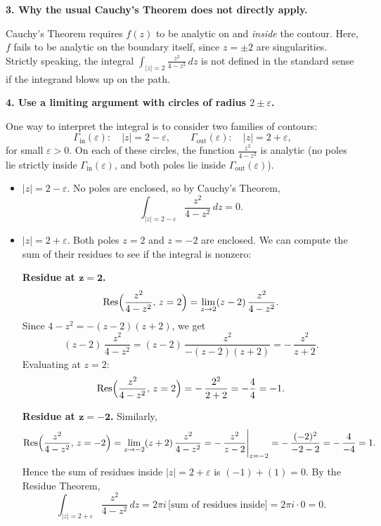 \documentclass[12pt]{article}
\theoremstyle{definition} %
\theoremstyle{plain} %
\begin{document}
\textbf{3. Why the usual Cauchy’s Theorem does not directly apply.}

Cauchy’s Theorem requires \(f(z)\) to be analytic on and \emph{inside} the contour.  Here, \(f\) fails to be analytic on the boundary itself, since \(z=\pm 2\) are singularities.  Strictly speaking, the integral
\(\displaystyle \int_{\lvert z\rvert=2} \frac{z^2}{4-z^2}\,dz\)
is not defined in the standard sense if the integrand blows up on the path.

\textbf{4. Use a limiting argument with circles of radius \(2 \pm \varepsilon\).}

One way to interpret the integral is to consider two families of contours:
\[
\Gamma_{\text{in}}(\varepsilon): \quad \lvert z\rvert = 2 - \varepsilon,
\qquad
\Gamma_{\text{out}}(\varepsilon): \quad \lvert z\rvert = 2 + \varepsilon,
\]
for small \(\varepsilon>0\).  On each of these circles, the function \(\frac{z^2}{4-z^2}\) is analytic (no poles lie strictly inside \(\Gamma_{\text{in}}(\varepsilon)\), and both poles lie inside \(\Gamma_{\text{out}}(\varepsilon)\)).

\begin{itemize}
\item
\(\displaystyle \lvert z\rvert = 2 - \varepsilon\).  
No poles are enclosed, so by Cauchy’s Theorem,
\[
\int_{\lvert z\rvert=2-\varepsilon} \frac{z^2}{4 - z^2}\,dz = 0.
\]

\item
\(\displaystyle \lvert z\rvert = 2 + \varepsilon\).  
Both poles \(z=2\) and \(z=-2\) are enclosed.  We can compute the sum of their residues to see if the integral is nonzero:

\textbf{Residue at \(\boldsymbol{z=2}\).}  
\[
\operatorname{Res}\Bigl(\frac{z^2}{4-z^2},\,z=2\Bigr)
=
\lim_{z\to 2} (z-2)\,\frac{z^2}{4-z^2}.
\]
Since \(4 - z^2 = -(z-2)(z+2)\), we get
\[
(z-2)\,\frac{z^2}{4-z^2}
= 
(z-2)\,\frac{z^2}{-(z-2)(z+2)}
= 
-\,\frac{z^2}{z+2}.
\]
Evaluating at \(z=2\):
\[
\operatorname{Res}\Bigl(\frac{z^2}{4-z^2},\,z=2\Bigr)
= 
-\,\frac{2^2}{2+2}
= 
-\frac{4}{4}
= 
-1.
\]

\textbf{Residue at \(\boldsymbol{z=-2}\).}  
Similarly,
\[
\operatorname{Res}\Bigl(\frac{z^2}{4-z^2},\,z=-2\Bigr)
= 
\lim_{z\to -2} (z+2)\,\frac{z^2}{4-z^2}
= 
-\,\frac{z^2}{z-2}\Bigg|_{z=-2}
= 
-\,\frac{(-2)^2}{-2-2}
= 
-\,\frac{4}{-4}
= 
1.
\]
Hence the sum of residues inside \(\lvert z\rvert=2+\varepsilon\) is \((-1) + (1) = 0\).  By the Residue Theorem,
\[
\int_{\lvert z\rvert=2+\varepsilon} \frac{z^2}{4-z^2}\,dz
=
2\pi i\,\bigl[\text{sum of residues inside}\bigr]
= 
2\pi i \cdot 0
= 
0.
\]
\end{itemize}
\end{document}
